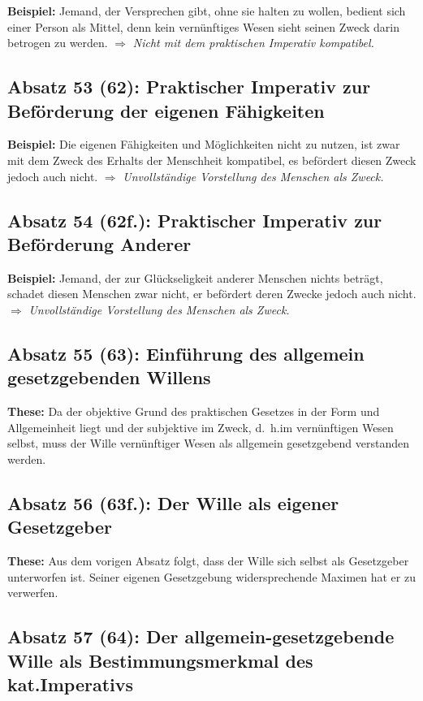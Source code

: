 \documentclass{llncs}
\begin{document}
\textbf{Beispiel:} Jemand, der Versprechen gibt, ohne sie halten zu wollen, bedient sich einer Person als Mittel, denn kein vernünftiges Wesen sieht seinen Zweck darin betrogen zu werden. $\Rightarrow$ \textit{Nicht mit dem praktischen Imperativ kompatibel.}

\subsection*{Absatz 53 (62): Praktischer Imperativ zur Beförderung der eigenen Fähigkeiten}

\textbf{Beispiel:} Die eigenen Fähigkeiten und Möglichkeiten nicht zu nutzen, ist zwar mit dem Zweck des Erhalts der Menschheit kompatibel, es befördert diesen Zweck jedoch auch nicht. $\Rightarrow$ \textit{Unvollständige Vorstellung des Menschen als Zweck.}

\subsection*{Absatz 54 (62f.): Praktischer Imperativ zur Beförderung Anderer}

\textbf{Beispiel:} Jemand, der zur Glückseligkeit anderer Menschen nichts beträgt, schadet diesen Menschen zwar nicht, er befördert deren Zwecke jedoch auch nicht. $\Rightarrow$ \textit{Unvollständige Vorstellung des Menschen als Zweck.}

\subsection*{Absatz 55 (63): Einführung des allgemein gesetzgebenden Willens}

\textbf{These:} Da der objektive Grund des praktischen Gesetzes in der Form und Allgemeinheit liegt und der subjektive im Zweck, d.~h.\@ im vernünftigen Wesen selbst, muss der Wille vernünftiger Wesen als allgemein gesetzgebend verstanden werden.

\subsection*{Absatz 56 (63f.): Der Wille als eigener Gesetzgeber}

\textbf{These:} Aus dem vorigen Absatz folgt, dass der Wille sich selbst als Gesetzgeber unterworfen ist. Seiner eigenen Gesetzgebung widersprechende Maximen hat er zu verwerfen.

\subsection*{Absatz 57 (64): Der allgemein-gesetzgebende Wille als Bestimmungsmerkmal des kat.\@ Imperativs}
\end{document}
